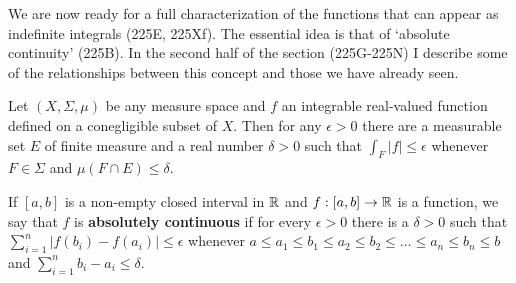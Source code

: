 
\def\chaptername{The Fundamental Theorem of Calculus}
\def\sectionname{Absolutely continuous functions}


We are now ready for a full characterization of the functions that can
appear as indefinite integrals (225E, 225Xf).   The essential idea
is that of `absolute continuity' (225B).   In the second half of the
section (225G-225N) I describe some of the relationships between
this concept and those we have already seen.

 Let
$(X,\Sigma,\mu)$ be any measure space and $f$ an integrable real-valued
function defined on a conegligible subset of $X$.
Then for any $\epsilon>0$ there are a measurable set
$E$ of finite measure and a real number
$\delta>0$ such that $\int_F|f|\le\epsilon$ whenever $F\in\Sigma$ and
$\mu(F\cap E)\le\delta$.


If $[a,b]$ is a non-empty
closed interval in $\Bbb R$ and $f:[a,b]\to\Bbb R$ is a function, we say
that $f$ is {\bf absolutely continuous} if for every $\epsilon>0$ there
is a $\delta>0$ such that $\sum_{i=1}^n|f(b_i)-f(a_i)|\le\epsilon$
whenever $a\le a_1\le b_1\le a_2\le b_2\le\ldots\le a_n\le b_n\le b$ and
$\sum_{i=1}^nb_i-a_i\le\delta$.



